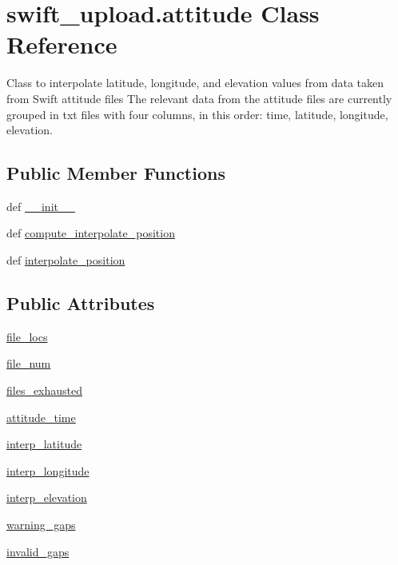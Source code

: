 \hypertarget{classswift__upload_1_1attitude}{\section{swift\-\_\-upload.\-attitude Class Reference}
\label{classswift__upload_1_1attitude}
}


Class to interpolate latitude, longitude, and elevation values from data taken from Swift attitude files The relevant data from the attitude files are currently grouped in txt files with four columns, in this order\-: time, latitude, longitude, elevation.  


\subsection*{Public Member Functions}
\begin{DoxyCompactItemize}
\item 
def \hyperlink{classswift__upload_1_1attitude_ac99f688772e96b5303f40adefa07e646}{\-\_\-\-\_\-init\-\_\-\-\_\-}
\item 
def \hyperlink{classswift__upload_1_1attitude_a393d23e7314de06fd487536ae42adf8c}{compute\-\_\-interpolate\-\_\-position}
\item 
def \hyperlink{classswift__upload_1_1attitude_abd05d9be607987027b4e5670f53c5b17}{interpolate\-\_\-position}
\end{DoxyCompactItemize}
\subsection*{Public Attributes}
\begin{DoxyCompactItemize}
\item 
\hyperlink{classswift__upload_1_1attitude_a7eb9757c91199dd9a44246678daa1049}{file\-\_\-locs}
\item 
\hyperlink{classswift__upload_1_1attitude_a5a86e47a33e8621d28b5eb4fd600ff6f}{file\-\_\-num}
\item 
\hyperlink{classswift__upload_1_1attitude_ac941b470c877ac9b1e9d6e5130fdd82e}{files\-\_\-exhausted}
\item 
\hyperlink{classswift__upload_1_1attitude_a31fae6bcf3664084a8ff477d6b780e9e}{attitude\-\_\-time}
\item 
\hyperlink{classswift__upload_1_1attitude_a6d512f1ccc9aef20f398c074c4fee60f}{interp\-\_\-latitude}
\item 
\hyperlink{classswift__upload_1_1attitude_acc0cf2dc8573ea6cebf0e3fd83df6dd7}{interp\-\_\-longitude}
\item 
\hyperlink{classswift__upload_1_1attitude_a7604e09edcd1b292c656a937fb33d462}{interp\-\_\-elevation}
\item 
\hyperlink{classswift__upload_1_1attitude_a8644c4ef3043a6ed4173a22a158855c5}{warning\-\_\-gaps}
\item 
\hyperlink{classswift__upload_1_1attitude_a7e94e961a197f72b4ce146a86101e25b}{invalid\-\_\-gaps}
\end{DoxyCompactItemize}


